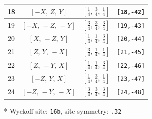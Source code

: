 \documentclass[fleqn,8pt]{jsarticle}
\begin{document}
\begin{longtable}{cccc}
18 & $\left[ - X,\, Z,\, Y \right]$ & $\left[ \frac{1}{4},\, \frac{3}{4},\, \frac{1}{4} \right]$ & {\tt [18,-42]} \\ \hline
19 & $\left[ - X,\, - Z,\, - Y \right]$ & $\left[ \frac{3}{4},\, \frac{3}{4},\, \frac{3}{4} \right]$ & {\tt [19,-43]} \\ \hline
20 & $\left[ X,\, - Z,\, Y \right]$ & $\left[ \frac{1}{4},\, \frac{1}{4},\, \frac{3}{4} \right]$ & {\tt [20,-44]} \\ \hline
21 & $\left[ Z,\, Y,\, - X \right]$ & $\left[ \frac{3}{4},\, \frac{1}{4},\, \frac{1}{4} \right]$ & {\tt [21,-45]} \\ \hline
22 & $\left[ Z,\, - Y,\, X \right]$ & $\left[ \frac{1}{4},\, \frac{1}{4},\, \frac{3}{4} \right]$ & {\tt [22,-46]} \\ \hline
23 & $\left[ - Z,\, Y,\, X \right]$ & $\left[ \frac{1}{4},\, \frac{3}{4},\, \frac{1}{4} \right]$ & {\tt [23,-47]} \\ \hline
24 & $\left[ - Z,\, - Y,\, - X \right]$ & $\left[ \frac{3}{4},\, \frac{3}{4},\, \frac{3}{4} \right]$ & {\tt [24,-48]} \\
\end{longtable}
* Wyckoff site: {\tt 16b}, site symmetry: {\tt .32}
\renewcommand{\arraystretch}{1.2}
\end{document}
